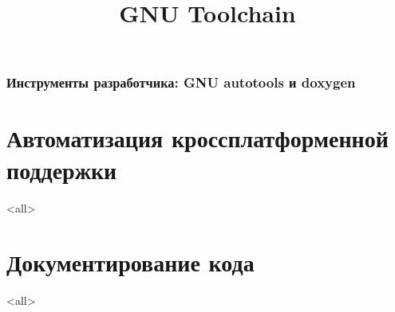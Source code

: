 
\title[toolchain]{GNU Toolchain}




\begin{frame}
	\frametitle{Инструменты разработчика: GNU autotools и doxygen}
	\titlepage
	\vspace{-0.5cm}
	\begin{center}
	\end{center}
\end{frame}

\begin{frame}
	\tableofcontents
\end{frame}



\section{Автоматизация кроссплатформенной поддержки}

\mode<all>{}

\section{Документирование кода}

\mode<all>{}




